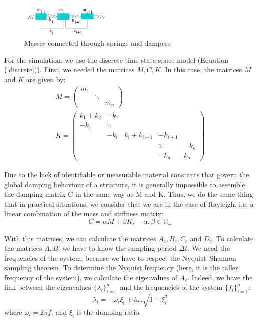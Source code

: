 \documentclass[journal]{IEEEtran}
\begin{document}
\begin{figure}[h!]
  \centering
  \includegraphics[width=0.4\textwidth]{images/ressorts.png}
  \caption{Masses connected through springs and dampers}
  \label{springs}
\end{figure}

For the simulation, we use the discrete-time state-space model (Equation (\ref{discrete})). First, we needed the matrices $M, C, K$. In this case, the matrices $M$ and $K$ are given by:
\begin{equation}
\begin{array}{l}
M =
\begin{pmatrix}
m_1\\
&\ddots\\
&&m_n
\end{pmatrix}
\\
K =
\begin{pmatrix}
k_1 + k_2 & - k_1 \\
- k_1 &\ddots\\
& -k_i & k_i + k_{i+1} & -k_{i+1} \\
&&&\ddots& -k_n\\
&&& -k_n & k_n
\end{pmatrix}
\end{array}
\end{equation}


Due to the lack of identifiable or measurable material
constants that govern the global damping behaviour of a structure, it is generally
impossible to assemble the damping matrix C in the same way as M and K.
Thus, we do the same thing that in practical situations: we consider that we are in the case of Rayleigh, i.e. a linear combination of the mass and stiffness matrix:
\begin{equation}
C = \alpha M + \beta K,\ \ \ \ \ \alpha, \beta \in \mathbb{R}_+
\end{equation}

With this matrices, we can calculate the matrices $A_c, B_c, C_c$ and $D_c$. To calculate the matrices $A, B$, we have to know the
sampling period $\Delta t$. We need the frequencies of the system, because we have to respect the Nyquist–Shannon sampling theorem.
To determine the Nyquist frequency (here, it is the taller frequency of the system), we calculate the eigenvalues of $A_c$. Indeed, we have the link between the eigenvalues $\{\lambda_i\}_{i=1}^n$ and the frequencies of the system $\{f_i\}_{i=1}^n$:
\begin{equation}
\lambda_i = - \omega_i \xi_i \pm i \omega_i \sqrt{1 - \xi_i^2}
\end{equation}
where $\omega_i = 2 \pi f_i$ and $\xi_i$ is the damping ratio.
\end{document}

